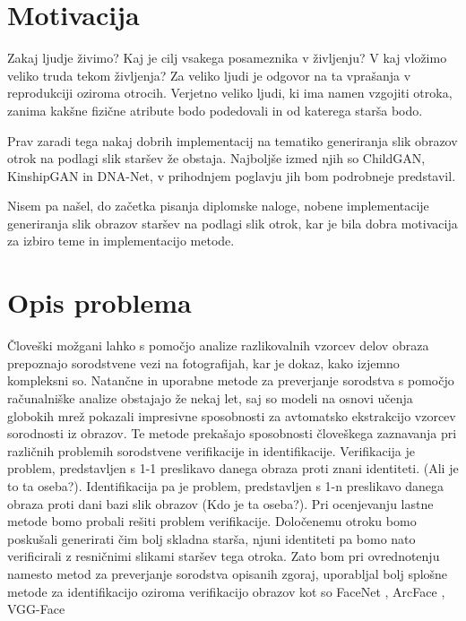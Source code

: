 \documentclass[a4paper,12pt,openright]{book}
\begin{document}
\section{Motivacija}
Zakaj ljudje živimo? Kaj je cilj vsakega posameznika v življenju? V kaj vložimo veliko truda tekom življenja? Za veliko ljudi je odgovor na ta vprašanja v reprodukciji oziroma otrocih. Verjetno veliko ljudi, ki ima namen vzgojiti otroka, zanima kakšne fizične atribute bodo podedovali in od katerega starša bodo. 

Prav zaradi tega nakaj dobrih implementacij na tematiko generiranja slik obrazov otrok na podlagi slik staršev že obstaja. Najboljše izmed njih so ChildGAN\cite{cui2021heredity}, KinshipGAN\cite{zkan2018KinshipganSO} in DNA-Net\cite{Gao2021WhatWY}, v prihodnjem poglavju jih bom podrobneje predstavil.

Nisem pa našel, do začetka pisanja diplomske naloge, nobene implementacije generiranja slik obrazov staršev na podlagi slik otrok, kar je bila dobra motivacija za izbiro teme in implementacijo metode.



\section{Opis problema}
Človeški možgani lahko s pomočjo analize razlikovalnih vzorcev delov obraza prepoznajo sorodstvene vezi na fotografijah, kar je dokaz, kako izjemno kompleksni so. Natančne in uporabne metode za preverjanje sorodstva s pomočjo računalniške analize \cite{KINNET, KinshipCNN, FIWverification} obstajajo že nekaj let, saj so modeli na osnovi učenja globokih mrež pokazali impresivne sposobnosti za avtomatsko ekstrakcijo vzorcev sorodnosti iz obrazov. Te metode prekašajo sposobnosti človeškega zaznavanja pri različnih problemih sorodstvene verifikacije in identifikacije. 
Verifikacija je problem, predstavljen s 1-1 preslikavo danega obraza proti znani identiteti. (Ali je to ta oseba?). Identifikacija pa je problem, predstavljen s 1-n preslikavo danega obraza proti dani bazi slik obrazov (Kdo je ta oseba?). Pri ocenjevanju lastne metode bomo probali rešiti problem verifikacije. Določenemu otroku bomo poskušali generirati čim bolj skladna starša, njuni identiteti pa bomo nato verificirali z resničnimi slikami staršev tega otroka. Zato bom pri ovrednotenju namesto metod za preverjanje sorodstva opisanih zgoraj, uporabljal bolj splošne metode za identifikacijo oziroma verifikacijo obrazov kot so FaceNet \cite{facenet}, ArcFace \cite{arcface}, VGG-Face \cite{Parkhi15}
\end{document}
